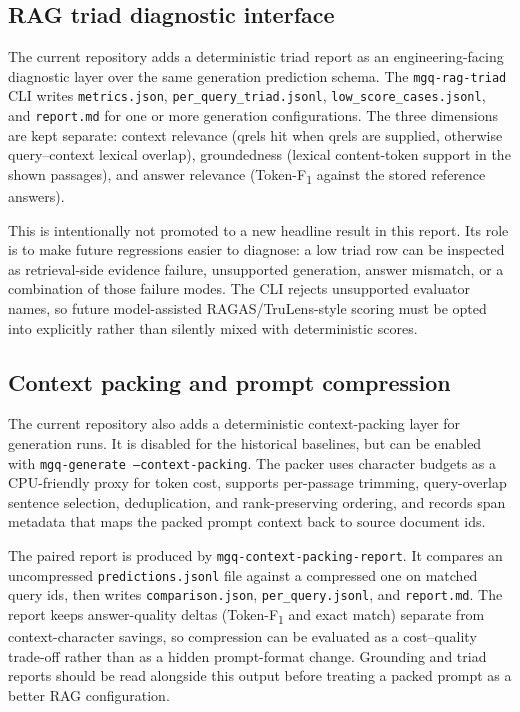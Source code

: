 \documentclass[11pt,a4paper]{article}
\newcommand{\F}{F\textsubscript{1}}
\newcommand{\Tokenf}{Token-\F}
\begin{document}
\subsection{RAG triad diagnostic interface}
\label{sec:w8-triad}

The current repository adds a deterministic triad report as an
engineering-facing diagnostic layer over the same generation prediction
schema.  The \texttt{mgq-rag-triad} CLI writes
\texttt{metrics.json}, \texttt{per\_query\_triad.jsonl},
\texttt{low\_score\_cases.jsonl}, and \texttt{report.md} for one or
more generation configurations.  The three dimensions are kept
separate: context relevance (qrels hit when qrels are supplied,
otherwise query--context lexical overlap), groundedness (lexical
content-token support in the shown passages), and answer relevance
(\Tokenf{} against the stored reference answers).

This is intentionally not promoted to a new headline result in this
report.  Its role is to make future regressions easier to diagnose:
a low triad row can be inspected as retrieval-side evidence failure,
unsupported generation, answer mismatch, or a combination of those
failure modes.  The CLI rejects unsupported evaluator names, so
future model-assisted RAGAS/TruLens-style scoring must be opted into
explicitly rather than silently mixed with deterministic scores.

\subsection{Context packing and prompt compression}
\label{sec:w9-context-packing}

The current repository also adds a deterministic context-packing
layer for generation runs.  It is disabled for the historical
baselines, but can be enabled with \texttt{mgq-generate
--context-packing}.  The packer uses character budgets as a
CPU-friendly proxy for token cost, supports per-passage trimming,
query-overlap sentence selection, deduplication, and rank-preserving
ordering, and records span metadata that maps the packed prompt
context back to source document ids.

The paired report is produced by
\texttt{mgq-context-packing-report}.  It compares an uncompressed
\texttt{predictions.jsonl} file against a compressed one on matched
query ids, then writes \texttt{comparison.json},
\texttt{per\_query.jsonl}, and \texttt{report.md}.  The report keeps
answer-quality deltas (\Tokenf{} and exact match) separate from
context-character savings, so compression can be evaluated as a
cost--quality trade-off rather than as a hidden prompt-format change.
Grounding and triad reports should be read alongside this output
before treating a packed prompt as a better RAG configuration.
\end{document}
